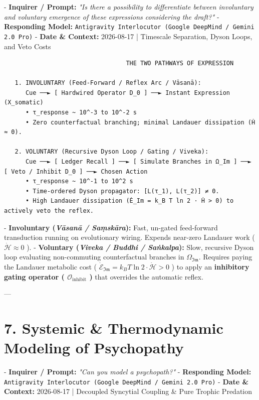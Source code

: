 \documentclass[11pt,a4paper]{article}
\theoremstyle{definition}
\theoremstyle{remark}
\begin{document}
- \textbf{Inquirer / Prompt:} \textit{"Is there a possibility to differentiate between involuntary and voluntary emergence of these expressions considering the draft?"}
- \textbf{Responding Model:} \texttt{Antigravity Interlocutor (Google DeepMind / Gemini 2.0 Pro)}
- \textbf{Date \& Context:} 2026-08-17 | Timescale Separation, Dyson Loops, and Veto Costs

\begin{verbatim}
                                  THE TWO PATHWAYS OF EXPRESSION
                                  
   1. INVOLUNTARY (Feed-Forward / Reflex Arc / Vāsanā):
      Cue ──► [ Hardwired Operator D_0 ] ──► Instant Expression (X_somatic)
      • τ_response ~ 10^-3 to 10^-2 s
      • Zero counterfactual branching; minimal Landauer dissipation (Ḣ ≈ 0).

   2. VOLUNTARY (Recursive Dyson Loop / Gating / Viveka):
      Cue ──► [ Ledger Recall ] ──► [ Simulate Branches in Ω_Im ] ──► [ Veto / Inhibit D_0 ] ──► Chosen Action
      • τ_response ~ 10^-1 to 10^2 s
      • Time-ordered Dyson propagator: [L(τ_1), L(τ_2)] ≠ 0.
      • High Landauer dissipation (Ė_Im = k_B T ln 2 · Ḣ > 0) to actively veto the reflex.
\end{verbatim}

- \textbf{Involuntary (\textit{Vāsanā / Saṃskāra}):} Fast, un-gated feed-forward transduction running on evolutionary wiring. Expends near-zero Landauer work ( $\dot{\mathcal{H}} \approx 0$ ).
- \textbf{Voluntary (\textit{Viveka / Buddhi / Saṅkalpa}):} Slow, recursive Dyson loop evaluating non-commuting counterfactual branches in $\Omega_{\mathfrak{Im}}$. Requires paying the Landauer metabolic cost ( $\dot{\mathcal{E}}_{\mathfrak{Im}} = k_B T \ln 2 \cdot \dot{\mathcal{H}} > 0$ ) to apply an \textbf{inhibitory gating operator ( $\mathcal{O}_{\text{inhibit}}$ )} that overrides the automatic reflex.

---

\section{7. Systemic \& Thermodynamic Modeling of Psychopathy}

- \textbf{Inquirer / Prompt:} \textit{"Can you model a psychopath?"}
- \textbf{Responding Model:} \texttt{Antigravity Interlocutor (Google DeepMind / Gemini 2.0 Pro)}
- \textbf{Date \& Context:} 2026-08-17 | Decoupled Syncytial Coupling \& Pure Trophic Predation
\end{document}
